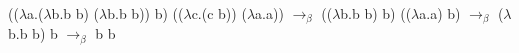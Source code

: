 \documentclass{article}
\begin{document}
(($\lambda$a.($\lambda$b.b b) ($\lambda$b.b b)) b) (($\lambda$c.(c b)) ($\lambda$a.a)) $\to _\beta$ (($\lambda$b.b b) b) (($\lambda$a.a) b) $\to _\beta$ ($\lambda$b.b b) b $\to _\beta$
b b
\end{document}
